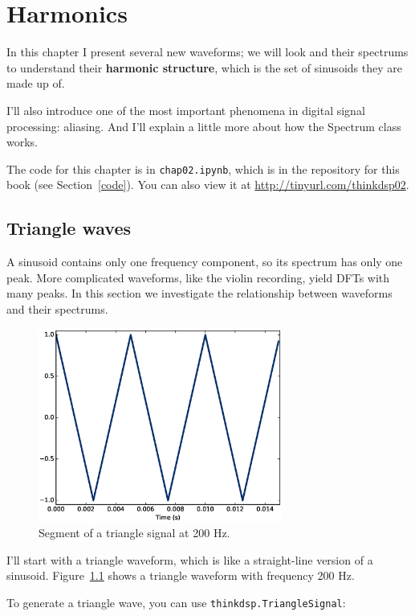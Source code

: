 \documentclass[12pt]{book}
\begin{document}
\chapter{Harmonics}
\label{harmonics}

In this chapter I present several new waveforms; we will look and
their spectrums to understand their {\bf harmonic structure}, which is
the set of sinusoids they are made up of.

I'll also introduce one of the most important phenomena in digital
signal processing: aliasing.  And I'll explain a little more about how
the Spectrum class works.

The code for this chapter is in {\tt chap02.ipynb}, which is in the
repository for this book (see Section~\ref{code}).
You can also view it at \url{http://tinyurl.com/thinkdsp02}.


\section{Triangle waves}
\label{triangle}

A sinusoid contains only one frequency component, so its spectrum
has only one peak.  More complicated waveforms, like the
violin recording, yield DFTs with many peaks.  In this section we
investigate the relationship between waveforms and their spectrums.

\begin{figure}
\centerline{\includegraphics[height=2.5in]{figs/triangle-200-1.eps}}
\caption{Segment of a triangle signal at 200 Hz.}
\label{fig.triangle.200.1}
\end{figure}

I'll start with a triangle waveform, which is like a straight-line
version of a sinusoid.  Figure~\ref{fig.triangle.200.1} shows a
triangle waveform with frequency 200 Hz.

To generate a triangle wave, you can use {\tt thinkdsp.TriangleSignal}:
\end{document}
